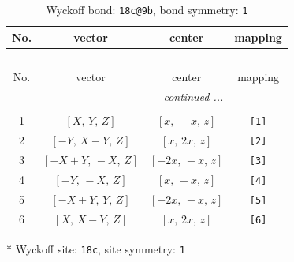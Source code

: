 \documentclass[fleqn,8pt]{jsarticle}
\begin{document}
\renewcommand{\arraystretch}{1.2}
\begin{longtable}{cccc}
\caption{Wyckoff bond: {\tt 18c@9b}, bond symmetry: {\tt 1}}
 \\
 \hline \hline
No. & vector & center & mapping \\ \hline \endfirsthead

\multicolumn{3}{l}{\tablename\ \thetable{}} \\
 \hline \hline
No. & vector & center & mapping \\ \hline \endhead

 \hline \hline
\multicolumn{3}{r}{\footnotesize\it continued ...} \\ \endfoot

 \hline \hline
\multicolumn{3}{r}{} \\ \endlastfoot

1 & $\left[ X,\, Y,\, Z \right]$ & $\left[ x,\, - x,\, z \right]$ & {\tt [1]} \\ \hline
2 & $\left[ - Y,\, X - Y,\, Z \right]$ & $\left[ x,\, 2 x,\, z \right]$ & {\tt [2]} \\ \hline
3 & $\left[ - X + Y,\, - X,\, Z \right]$ & $\left[ - 2 x,\, - x,\, z \right]$ & {\tt [3]} \\ \hline
4 & $\left[ - Y,\, - X,\, Z \right]$ & $\left[ x,\, - x,\, z \right]$ & {\tt [4]} \\ \hline
5 & $\left[ - X + Y,\, Y,\, Z \right]$ & $\left[ - 2 x,\, - x,\, z \right]$ & {\tt [5]} \\ \hline
6 & $\left[ X,\, X - Y,\, Z \right]$ & $\left[ x,\, 2 x,\, z \right]$ & {\tt [6]} \\
\end{longtable}
* Wyckoff site: {\tt 18c}, site symmetry: {\tt 1}
\renewcommand{\arraystretch}{1.2}
\end{document}
